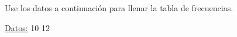 \documentclass{cdplf-prueba}
\begin{document}
\subsection{}

Use los datos a continuación para llenar la tabla de frecuencias.

\underline{Datos:} \hspace{4pt} 10 \hspace{4pt}\textbullet\hspace{4pt} 12 \hspace{4pt}\textbu
\end{document}
